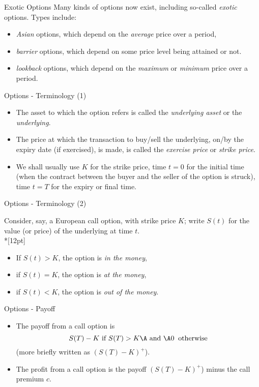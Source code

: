 {Exotic Options}
Many kinds of options now exist, including so-called {\it exotic}
options.  Types include:
\begin{itemize}
  \item<1-> {\it Asian} options, which depend on the
{\it average} price over a period,
\item<2-> {\it barrier} options, which depend on some price level being
attained or not.
\item<3-> {\it lookback} options, which
depend on the  {\it maximum} or {\it minimum} price over a period.
\end{itemize}

{Options - Terminology (1)}

\begin{itemize}
\item<1-> The asset to which the option refers is called the {\it underlying
asset} or the {\it underlying}.
\item<2->
The price at which the transaction
to buy/sell the underlying, on/by the expiry date (if exercised),
is made, is called the {\it exercise price} or {\it strike price}.
\item<3-> We shall usually use $K$ for the strike price, time $t = 0$ for
the initial time (when the contract between the buyer and the
seller of the option is struck), time $t = T$ for the expiry or
final time.
\end{itemize}

{Options - Terminology (2)}

Consider, say, a European call option, with strike price $K$;
write $S(t)$ for the value (or price) of the underlying at time
$t$.\\*[12pt]
\begin{itemize}
  \item<1-> If $S(t) > K$, the option is {\it in the money},
  \item<2-> if $S(t) = K$, the option is {\it at the money},
  \item<3-> if $S(t) < K$, the option is {\it out of the money}.
\end{itemize}

{Options - Payoff}

\begin{itemize}
  \item<1-> The payoff from a call option is $$ S(T) - K \mbox{ if } S(T)
> K\A \mbox{ and }\A 0 \;\; \mbox{otherwise} $$ (more briefly
written as  $(S(T) - K)^+$).
\item<2-> The profit from a call option is the payoff $(S(T) - K)^+$) minus the call premium $c$.
\end{itemize}


